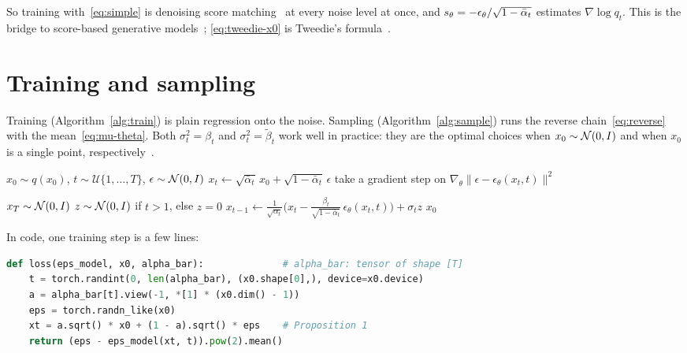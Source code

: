 So training with~\eqref{eq:simple} is denoising score matching~\cite{vincent2011} at every noise level at once, and $s_\theta = -\epsilon_\theta/\sqrt{1-\bar\alpha_t}$ estimates $\nabla \log q_t$.
This is the bridge to score-based generative models~\cite{song2019}; \eqref{eq:tweedie-x0} is Tweedie's formula~\cite{efron2011}.

\section{Training and sampling}\label{sec:algorithms}
Training (Algorithm~\ref{alg:train}) is plain regression onto the noise.
Sampling (Algorithm~\ref{alg:sample}) runs the reverse chain~\eqref{eq:reverse} with the mean~\eqref{eq:mu-theta}.
Both $\sigma_t^2 = \beta_t$ and $\sigma_t^2 = \tilde\beta_t$ work well in practice: they are the optimal choices when $x_0 \sim \mathcal{N}(0, I)$ and when $x_0$ is a single point, respectively~\cite{ho2020}.

\begin{algorithm}[t]
  \caption{Training}\label{alg:train}
  \begin{algorithmic}[1]
    \Repeat
      \State $x_0 \sim q(x_0)$, \quad $t \sim \mathcal{U}\{1, \dots, T\}$, \quad $\epsilon \sim \mathcal{N}(0, I)$
      \State $x_t \gets \sqrt{\bar\alpha_t}\,x_0 + \sqrt{1-\bar\alpha_t}\,\epsilon$ 
      \State take a gradient step on $\nabla_\theta \|\epsilon - \epsilon_\theta(x_t, t)\|^2$
  \end{algorithmic}
\end{algorithm}

\begin{algorithm}[t]
  \caption{Ancestral sampling}\label{alg:sample}
  \begin{algorithmic}[1]
    \State $x_T \sim \mathcal{N}(0, I)$
      \State $z \sim \mathcal{N}(0, I)$ if $t > 1$, else $z = 0$
      \State $x_{t-1} \gets \frac{1}{\sqrt{\alpha_t}}\big(x_t - \frac{\beta_t}{\sqrt{1-\bar\alpha_t}}\,\epsilon_\theta(x_t, t)\big) + \sigma_t z$ 
    \EndFor
    \State \Return $x_0$
  \end{algorithmic}
\end{algorithm}

In code, one training step is a few lines:
\begin{lstlisting}[language=python]
def loss(eps_model, x0, alpha_bar):              # alpha_bar: tensor of shape [T]
    t = torch.randint(0, len(alpha_bar), (x0.shape[0],), device=x0.device)
    a = alpha_bar[t].view(-1, *[1] * (x0.dim() - 1))
    eps = torch.randn_like(x0)
    xt = a.sqrt() * x0 + (1 - a).sqrt() * eps    # Proposition 1
    return (eps - eps_model(xt, t)).pow(2).mean()
\end{lstlisting}

